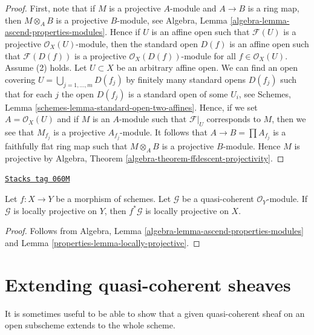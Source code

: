 \begin{proof}
First, note that if $M$ is a projective $A$-module and $A \to B$ is a
ring map, then $M \otimes_A B$ is a projective $B$-module, see
Algebra, Lemma \ref{algebra-lemma-ascend-properties-modules}.
Hence if $U$ is an affine open such that $\mathcal{F}(U)$ is a projective
$\mathcal{O}_X(U)$-module, then the standard open $D(f)$ is an
affine open such that $\mathcal{F}(D(f))$ is a projective
$\mathcal{O}_X(D(f))$-module for all $f \in \mathcal{O}_X(U)$.
Assume (2) holds. Let $U \subset X$ be an arbitrary affine open.
We can find an open covering $U = \bigcup_{j = 1, \ldots, m} D(f_j)$
by finitely many standard opens $D(f_j)$ such that for each
$j$ the open $D(f_j)$ is a standard open of some $U_i$, see
Schemes, Lemma \ref{schemes-lemma-standard-open-two-affines}.
Hence, if we set $A = \mathcal{O}_X(U)$ and if $M$ is an $A$-module
such that $\mathcal{F}|_U$ corresponds to $M$, then we see that
$M_{f_j}$ is a projective $A_{f_j}$-module. It follows that
$A \to B = \prod A_{f_j}$ is a faithfully flat ring map
such that $M \otimes_A B$ is a projective $B$-module.
Hence $M$ is projective by
Algebra, Theorem \ref{algebra-theorem-ffdescent-projectivity}.
\end{proof}

\begin{lemma}
\label{properties-lemma-locally-projective-pullback}
\href{https://stacks.math.columbia.edu/tag/060M}{\texttt{Stacks tag 060M}}

Let $f : X \to Y$ be a morphism of schemes.
Let $\mathcal{G}$ be a quasi-coherent $\mathcal{O}_Y$-module.
If $\mathcal{G}$ is locally projective on $Y$, then $f^*\mathcal{G}$
is locally projective on $X$.
\end{lemma}

\begin{proof}

Follows from
Algebra, Lemma \ref{algebra-lemma-ascend-properties-modules}
and Lemma \ref{properties-lemma-locally-projective}.
\end{proof}

\section{Extending quasi-coherent sheaves}
\label{properties-section-extending-quasi-coherent-sheaves}
It is sometimes useful to be able to show that a given quasi-coherent
sheaf on an open subscheme extends to the whole scheme.

